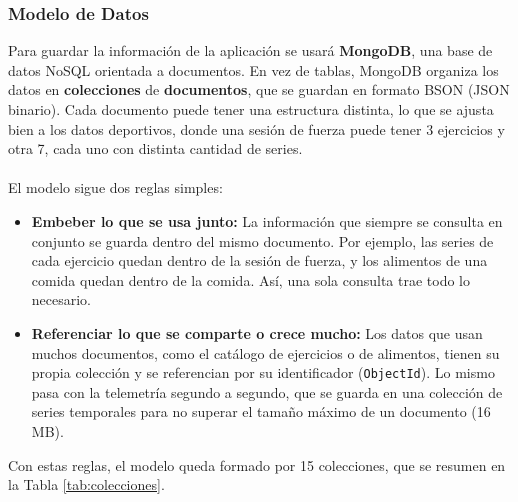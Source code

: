 \subsubsection{Modelo de Datos}

Para guardar la información de la aplicación se usará \textbf{MongoDB}, una base de datos NoSQL orientada a documentos. En vez de tablas, MongoDB organiza los datos en \textbf{colecciones} de \textbf{documentos}, que se guardan en formato BSON (JSON binario). Cada documento puede tener una estructura distinta, lo que se ajusta bien a los datos deportivos, donde una sesión de fuerza puede tener 3 ejercicios y otra 7, cada uno con distinta cantidad de series.
\\\\
El modelo sigue dos reglas simples:
\begin{itemize}
    \item \textbf{Embeber lo que se usa junto:} La información que siempre se consulta en conjunto se guarda dentro del mismo documento. Por ejemplo, las series de cada ejercicio quedan dentro de la sesión de fuerza, y los alimentos de una comida quedan dentro de la comida. Así, una sola consulta trae todo lo necesario.
    \item \textbf{Referenciar lo que se comparte o crece mucho:} Los datos que usan muchos documentos, como el catálogo de ejercicios o de alimentos, tienen su propia colección y se referencian por su identificador (\texttt{ObjectId}). Lo mismo pasa con la telemetría segundo a segundo, que se guarda en una colección de series temporales para no superar el tamaño máximo de un documento (16 MB).
\end{itemize}
\newpage
Con estas reglas, el modelo queda formado por 15 colecciones, que se resumen en la Tabla \ref{tab:colecciones}.
